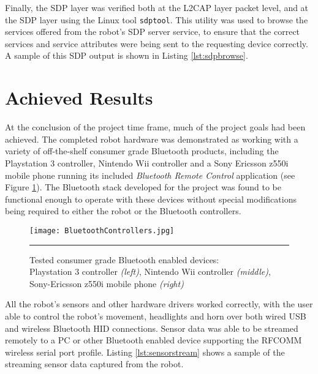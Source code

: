 

Finally, the SDP layer was verified both at the L2CAP layer packet level, and at the SDP layer using the Linux tool \texttt{sdptool}. This utility was used to browse the services offered from the robot's SDP server service, to ensure that the correct services and service attributes were being sent to the requesting device correctly. A sample of this SDP output is shown in Listing \ref{lst:sdpbrowse}.



\section{Achieved Results}

At the conclusion of the project time frame, much of the project goals had been achieved. The completed robot hardware was demonstrated as working with a variety of off-the-shelf consumer grade Bluetooth products, including the Playstation 3 controller, Nintendo Wii controller and a Sony Ericsson z550i mobile phone running its included \textit{Bluetooth Remote Control} application (see Figure \ref{fig:workingbtcontrollers}). The Bluetooth stack developed for the project was found to be functional enough to operate with these devices without special modifications being required to either the robot or the Bluetooth controllers.

\begin{figure}[tbph]
	\vspace{1em}
	\centering
		\texttt{[image: BluetoothControllers.jpg]}
	\rule{35em}{0.5pt}
	\caption[Tested Working Controllers]{Tested consumer grade Bluetooth enabled devices: \\ Playstation 3 controller \textit{(left)}, Nintendo Wii controller \textit{(middle)}, Sony-Ericsson z550i mobile phone \textit{(right)} }
	\label{fig:workingbtcontrollers}
\end{figure}

All the robot's sensors and other hardware drivers worked correctly, with the user able to control the robot's movement, headlights and horn over both wired USB and wireless Bluetooth HID connections. Sensor data was able to be streamed remotely to a PC or other Bluetooth enabled device supporting the RFCOMM wireless serial port profile. Listing \ref{lst:sensorstream} shows a sample of the streaming sensor data captured from the robot.

